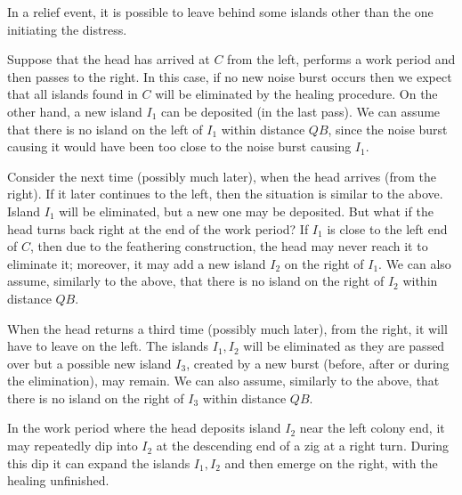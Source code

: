 \documentclass[11pt]{memoir}
\theoremstyle{definition} %
\def\B{B}
\newcommand{\Q}{Q}
\begin{document}
In a relief event, it is possible to leave behind some islands other than the one initiating the distress.


\begin{example}\label{xmp:3-islands}
  Suppose that the head has arrived at \( C \) from the left,
performs a work period and then passes to the right.
In this case, if no new noise burst occurs then we expect that
all islands found in \( C \) will be eliminated by the healing procedure.
On the other hand, a new island \( I_{1} \) can be deposited (in the last pass).
We can assume that there is no island on the left of  \( I_{1} \) 
within distance \( \Q\B \), since the noise burst
causing it would have been too close to the noise burst causing \( I_{1} \).

Consider the next time (possibly much later), when the head arrives (from the right).
If it later continues to the left, then the situation is similar to the above.
Island \( I_{1} \) will be eliminated, but a new one may be deposited.
But what if the head turns back right at the end of the work period?
If \( I_{1} \) is close to the left end of \( C \), then due to the feathering
construction, the head may never reach it to eliminate it; moreover,
it may add a new island \( I_{2} \) on the right of \( I_{1} \).
We can also assume, similarly to the above, 
that there is no island on the right of  \( I_{2} \) within distance \( \Q\B \).

When the head returns a third time (possibly much later), 
from the right, it will have to leave on the left.
The islands \( I_{1},I_{2} \) will be eliminated as they are passed over
but a possible new island
\( I_{3} \), created by a new burst (before, after or during the elimination), may remain.
We can also assume, similarly to the above, 
that there is no island on the right of  \( I_{3} \) within distance \( \Q\B \).

In the work period where the head deposits island \( I_{2} \) near the left colony
end, it may repeatedly dip into \( I_{2} \) at the descending end of a zig at a
right turn.
During this dip it can expand the islands
\( I_{1}, I_{2} \) and then emerge on the right, with the healing unfinished.
 \end{example}
\end{document}
